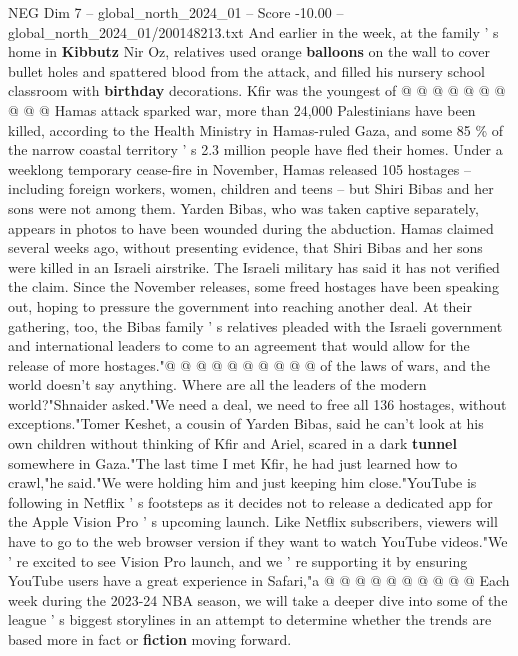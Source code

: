 \begin{textsample}{NEG Dim 7 – global\_north\_2024\_01 – Score -10.00 – global\_north\_2024\_01/200148213.txt}
And earlier in the week, at the family ' s home in \textbf{Kibbutz} Nir Oz, relatives used orange \textbf{balloons} on the wall to cover bullet holes and spattered blood from the attack, and filled his nursery school classroom with \textbf{birthday} decorations.
Kfir was the youngest of @ @ @ @ @ @ @ @ @ @ Hamas attack sparked war, more than 24,000 Palestinians have been killed, according to the Health Ministry in Hamas-ruled Gaza, and some 85 \% of the narrow coastal territory ' s 2.3 million people have fled their homes.
Under a weeklong temporary cease-fire in November, Hamas released 105 hostages -- including foreign workers, women, children and teens -- but Shiri Bibas and her sons were not among them.
Yarden Bibas, who was taken captive separately, appears in photos to have been wounded during the abduction.
Hamas claimed several weeks ago, without presenting evidence, that Shiri Bibas and her sons were killed in an Israeli airstrike.
The Israeli military has said it has not verified the claim.
Since the November releases, some freed hostages have been speaking out, hoping to pressure the government into reaching another deal.
At their gathering, too, the Bibas family ' s relatives pleaded with the Israeli government and international leaders to come to an agreement that would allow for the release of more hostages."@ @ @ @ @ @ @ @ @ @ of the laws of wars, and the world doesn't say anything.
Where are all the leaders of the modern world?"Shnaider asked."We need a deal, we need to free all 136 hostages, without exceptions."Tomer Keshet, a cousin of Yarden Bibas, said he can't look at his own children without thinking of Kfir and Ariel, scared in a dark \textbf{tunnel} somewhere in Gaza."The last time I met Kfir, he had just learned how to crawl,"he said."We were holding him and just keeping him close."YouTube is following in Netflix ' s footsteps as it decides not to release a dedicated app for the Apple Vision Pro ' s upcoming launch.
Like Netflix subscribers, viewers will have to go to the web browser version if they want to watch YouTube videos."We ' re excited to see Vision Pro launch, and we ' re supporting it by ensuring YouTube users have a great experience in Safari,"a @ @ @ @ @ @ @ @ @ @ Each week during the 2023-24 NBA season, we will take a deeper dive into some of the league ' s biggest storylines in an attempt to determine whether the trends are based more in fact or \textbf{fiction} moving forward.

\end{textsample}
